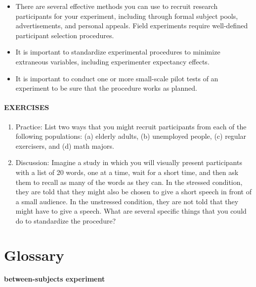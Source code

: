 \documentclass[
]{krantz}
\providecommand{\tightlist}{%
  \setlength{\itemsep}{0pt}\setlength{\parskip}{0pt}}
\begin{document}
\begin{itemize}
\tightlist
\item
  There are several effective methods you can use to recruit research participants for your experiment, including through formal subject pools, advertisements, and personal appeals. Field experiments require well-defined participant selection procedures.
\item
  It is important to standardize experimental procedures to minimize extraneous variables, including experimenter expectancy effects.
\item
  It is important to conduct one or more small-scale pilot tests of an experiment to be sure that the procedure works as planned.
\end{itemize}

\paragraph*{EXERCISES}\label{exercises-7}

\begin{enumerate}
\def\labelenumi{\arabic{enumi}.}
\tightlist
\item
  Practice: List two ways that you might recruit participants from each of the following populations: (a) elderly adults, (b) unemployed people, (c) regular exercisers, and (d) math majors.
\item
  Discussion: Imagine a study in which you will visually present participants with a list of 20 words, one at a time, wait for a short time, and then ask them to recall as many of the words as they can. In the stressed condition, they are told that they might also be chosen to give a short speech in front of a small audience. In the unstressed condition, they are not told that they might have to give a speech. What are several specific things that you could do to standardize the procedure?
\end{enumerate}

\section{Glossary}\label{glossary-2}

\paragraph*{between-subjects experiment}\label{between-subjects-experiment}
\end{document}
